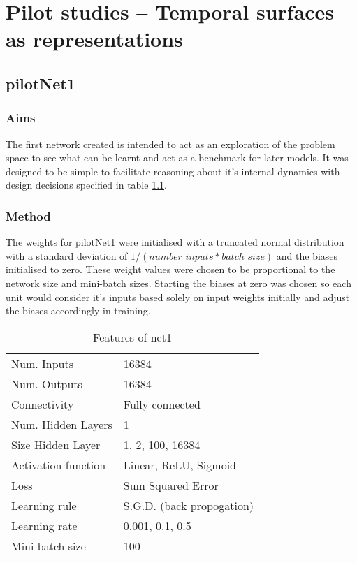 \chapter{Pilot studies -- Temporal surfaces as representations}
\label{ch:pilot}

\section{pilotNet1}


\subsection{Aims}
The first network created is intended to act as an exploration of the problem space to see what can be learnt and act as a benchmark for later models. 
It was designed to be simple to facilitate reasoning about it's internal dynamics with design decisions specified in table \ref{table:net1def}.


\subsection{Method}
The weights for pilotNet1 were initialised with a truncated normal distribution with a standard deviation of $1 / ( number\_inputs * batch\_size )$ and the biases initialised to zero.
These weight values were chosen to be proportional to the network size and mini-batch sizes. 
Starting the biases at zero was chosen so each unit would consider it's inputs based solely on input weights initially and adjust the biases accordingly in training. 

\begin{table}[h]
\centering
\begin{tabular}{ | l | l | }
    \hline
    Num. Inputs & 16384 \\
    Num. Outputs & 16384 \\
    Connectivity & Fully connected \\
    Num. Hidden Layers & 1 \\
    Size Hidden Layer & 1, 2, 100, 16384  \\
    Activation function & Linear, ReLU, Sigmoid \\
    Loss & Sum Squared Error \\
    Learning rule & S.G.D. (back propogation) \\
    Learning rate & 0.001, 0.1, 0.5 \\
    Mini-batch size & 100 \\
    \hline
\end{tabular}
\caption{Features of net1}
\label{table:net1def}
\end{table}

